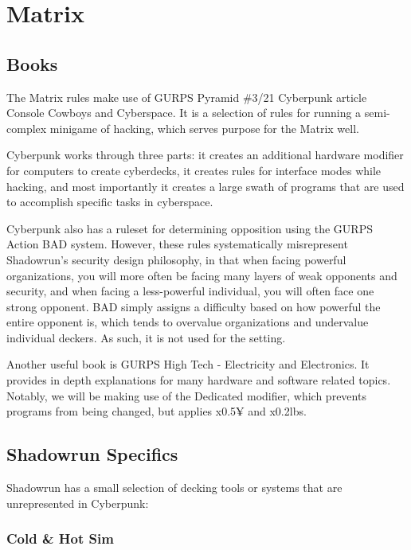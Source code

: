 \section{Matrix}

\begin{multicols*}{3}
	
	\subsection{Books}
	
	The Matrix rules make use of GURPS Pyramid \#3/21 Cyberpunk article Console Cowboys and Cyberspace. It is a selection of rules for running a semi-complex minigame of hacking, which serves purpose for the Matrix well.
	
	Cyberpunk works through three parts: it creates an additional hardware modifier for computers to create cyberdecks, it creates rules for interface modes while hacking, and most importantly it creates a large swath of programs that are used to accomplish specific tasks in cyberspace.
	
	Cyberpunk also has a ruleset for determining opposition using the GURPS Action BAD system. However, these rules systematically misrepresent Shadowrun's security design philosophy, in that when facing powerful organizations, you will more often be facing many layers of weak opponents and security, and when facing a less-powerful individual, you will often face one strong opponent. BAD simply assigns a difficulty based on how powerful the entire opponent is, which tends to overvalue organizations and undervalue individual deckers. As such, it is not used for the setting.
	
	Another useful book is GURPS High Tech - Electricity and Electronics. It provides in depth explanations for many hardware and software related topics. Notably, we will be making use of the Dedicated modifier, which prevents programs from being changed, but applies x0.5¥ and x0.2lbs. 
	
	\subsection{Shadowrun Specifics}
	
	Shadowrun has a small selection of decking tools or systems that are unrepresented in Cyberpunk:
	
	\subsubsection{Cold \& Hot Sim}\label{sim_mode}
	

\end{multicols*}
